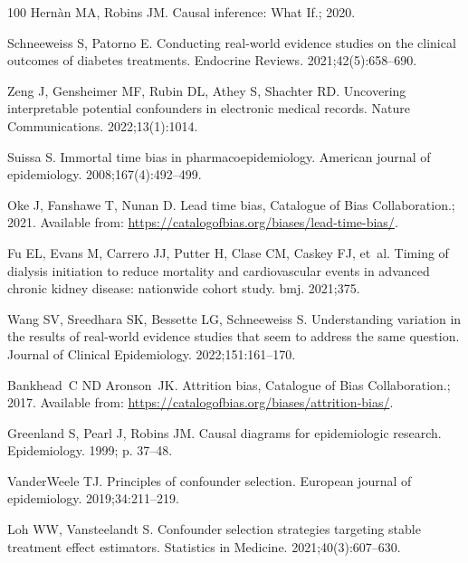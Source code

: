\documentclass[10pt,letterpaper]{article}
\begin{document}
\begin{thebibliography}{100}
  Hernàn MA, Robins JM.
  \newblock Causal inference: What If.; 2020.

  Schneeweiss S, Patorno E.
  \newblock Conducting real-world evidence studies on the clinical outcomes of diabetes treatments.
  \newblock Endocrine Reviews. 2021;42(5):658--690.

  Zeng J, Gensheimer MF, Rubin DL, Athey S, Shachter RD.
  \newblock Uncovering interpretable potential confounders in electronic medical records.
  \newblock Nature Communications. 2022;13(1):1014.

  Suissa S.
  \newblock Immortal time bias in pharmacoepidemiology.
  \newblock American journal of epidemiology. 2008;167(4):492--499.

  Oke J, Fanshawe T, Nunan D. Lead time bias, Catalogue of Bias Collaboration.; 2021.
  \newblock Available from: \url{https://catalogofbias.org/biases/lead-time-bias/}.

  Fu EL, Evans M, Carrero JJ, Putter H, Clase CM, Caskey FJ, et~al.
  \newblock Timing of dialysis initiation to reduce mortality and cardiovascular events in advanced chronic kidney disease: nationwide cohort study.
  \newblock bmj. 2021;375.

  Wang SV, Sreedhara SK, Bessette LG, Schneeweiss S.
  \newblock Understanding variation in the results of real-world evidence studies that seem to address the same question.
  \newblock Journal of Clinical Epidemiology. 2022;151:161--170.

  Bankhead~C ND Aronson~JK. Attrition bias, Catalogue of Bias Collaboration.; 2017.
  \newblock Available from: \url{https://catalogofbias.org/biases/attrition-bias/}.

  Greenland S, Pearl J, Robins JM.
  \newblock Causal diagrams for epidemiologic research.
  \newblock Epidemiology. 1999; p. 37--48.

  VanderWeele TJ.
  \newblock Principles of confounder selection.
  \newblock European journal of epidemiology. 2019;34:211--219.

  Loh WW, Vansteelandt S.
  \newblock Confounder selection strategies targeting stable treatment effect estimators.
  \newblock Statistics in Medicine. 2021;40(3):607--630.


\end{thebibliography}
\end{document}
